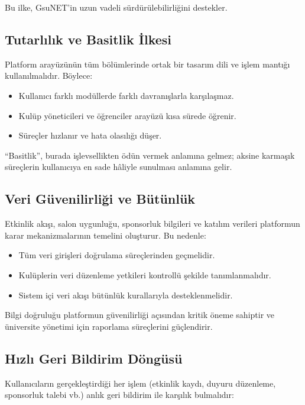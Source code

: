 \documentclass[a4paper,12pt]{report}
\begin{document}
Bu ilke, GsuNET’in uzun vadeli sürdürülebilirliğini destekler.

\subsection{Tutarlılık ve Basitlik İlkesi}

Platform arayüzünün tüm bölümlerinde ortak bir tasarım dili ve işlem mantığı kullanılmalıdır. Böylece:

\begin{itemize}
    \item Kullanıcı farklı modüllerde farklı davranışlarla karşılaşmaz.
    \item Kulüp yöneticileri ve öğrenciler arayüzü kısa sürede öğrenir.
    \item Süreçler hızlanır ve hata olasılığı düşer.
\end{itemize}

“Basitlik”, burada işlevsellikten ödün vermek anlamına gelmez; aksine karmaşık süreçlerin kullanıcıya en sade hâliyle sunulması anlamına gelir.

\subsection{Veri Güvenilirliği ve Bütünlük}

Etkinlik akışı, salon uygunluğu, sponsorluk bilgileri ve katılım verileri platformun karar mekanizmalarının temelini oluşturur. Bu nedenle:

\begin{itemize}
    \item Tüm veri girişleri doğrulama süreçlerinden geçmelidir.
    \item Kulüplerin veri düzenleme yetkileri kontrollü şekilde tanımlanmalıdır.
    \item Sistem içi veri akışı bütünlük kurallarıyla desteklenmelidir.
\end{itemize}

Bilgi doğruluğu platformun güvenilirliği açısından kritik öneme sahiptir ve üniversite yönetimi için raporlama süreçlerini güçlendirir.

\subsection{Hızlı Geri Bildirim Döngüsü}

Kullanıcıların gerçekleştirdiği her işlem (etkinlik kaydı, duyuru düzenleme, sponsorluk talebi vb.) anlık geri bildirim ile karşılık bulmalıdır:
\end{document}
